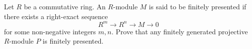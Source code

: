 





\begin{prob}[S2018-Q2]
    Let \(R\) be a commutative ring. An \(R\)-module \(M\) is said to be finitely presented if there exists a right-exact sequence
    \[R^m \longrightarrow R^n \longrightarrow M \longrightarrow 0\]
    for some non-negative integers \(m,n\). Prove that any finitely generated projective \(R\)-module \(P\) is finitely presented.
\end{prob}



